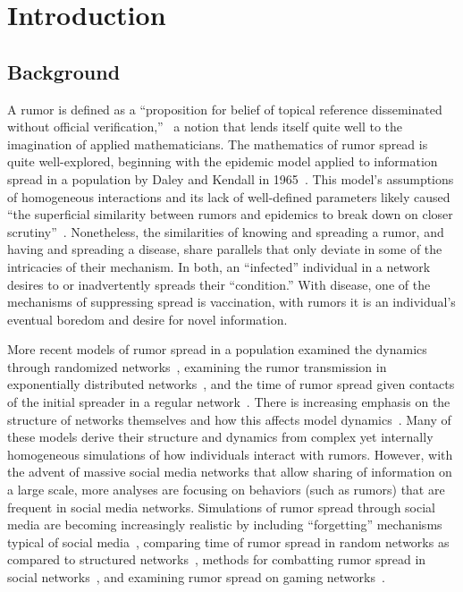 \section{Introduction }
\label{sec:introduction}

\subsection{Background}
\label{subsec:background}

A rumor is defined as a ``proposition for belief of topical reference disseminated without official verification,''~\cite{knapp-1944} a notion that lends itself quite well to the imagination of applied mathematicians.
The mathematics of rumor spread is quite well-explored, beginning with the epidemic model applied to information spread in a population by Daley and Kendall in 1965~\cite{daley-1965}.
This model's assumptions of homogeneous interactions and its lack of well-defined parameters likely caused ``the superficial similarity between rumors and epidemics to break down on closer scrutiny''~\cite{daley-1965}.
Nonetheless, the similarities of knowing and spreading a rumor, and having and spreading a disease, share parallels that only deviate in some of the intricacies of their mechanism.
In both, an ``infected'' individual in a network desires to or inadvertently spreads their ``condition.''
With disease, one of the mechanisms of suppressing spread is vaccination, with rumors it is an individual's eventual boredom and desire for novel information.

More recent models of rumor spread in a population examined the dynamics through randomized networks~\cite{karp-2000}, examining the rumor transmission in exponentially distributed networks~\cite{moreno-2004}, and the time of rumor spread given contacts of the initial spreader in a regular network~\cite{fount-2010}.
There is increasing emphasis on the structure of networks themselves and how this affects model dynamics~\cite{zhang-2013, pellis-2015, pellis-2012, ball-2010, zhou-2007}.
Many of these models derive their structure and dynamics from complex yet internally homogeneous simulations of how individuals interact with rumors.
However, with the advent of massive social media networks that allow sharing of information on a large scale, more analyses are focusing on behaviors (such as rumors) that are frequent in social media networks.
Simulations of rumor spread through social media are becoming increasingly realistic by including ``forgetting'' mechanisms typical of social media~\cite{zhao-2011}, comparing time of rumor spread in random networks as compared to structured networks~\cite{liu-2011}, methods for combatting rumor spread in social networks~\cite{tripathy-2010}, and examining rumor spread on gaming networks~\cite{grab-2008}.

